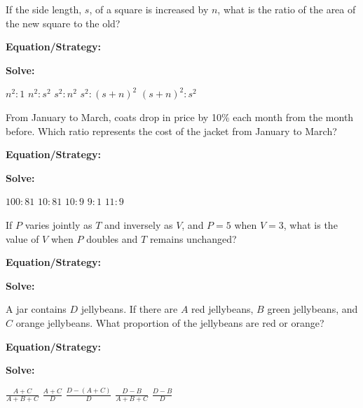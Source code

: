 \vfill
\newpage
\begin{multicols*}{2}
\begin{outline}[enumerate]
\medium

\1 If the side length, $s$, of a square is increased by $n$, what is the ratio of the area of the new square to the old?

\bigskip
\textbf{Equation/Strategy:} \hrulefill

\bigskip
\textbf{Solve:}

\vfill
\2 $n^2:1$
\2 $n^2:s^2$
\2 $s^2:n^2$
\2 $s^2:(s+n)^2$
\2 $(s+n)^2:s^2$

\midline

\1 From January to March, coats drop in price by 10\% each month from the month before. Which ratio represents the cost of the jacket from January to March?

\bigskip
\textbf{Equation/Strategy:} \hrulefill

\bigskip
\textbf{Solve:}

\vfill
\2 $100:81$
\2 $10:81$
\2 $10:9$
\2 $9:1$
\2 $11:9$

\columnbreak
\advanced

\1 If $P$ varies jointly as $T$ and inversely as $V$, and $P=5$ when $V=3$, what is the value of $V$ when $P$ doubles and $T$ remains unchanged?

\bigskip
\textbf{Equation/Strategy:} \hrulefill

\bigskip
\textbf{Solve:}

\vfill
{}

\midline

\1 A jar contains $D$ jellybeans. If there are $A$ red jellybeans, $B$ green jellybeans, and $C$ orange jellybeans. What proportion of the jellybeans are red or orange?

\bigskip
\textbf{Equation/Strategy:} \hrulefill

\bigskip
\textbf{Solve:}

\vfill
\2 $\frac{A+C}{A+B+C}$
\2 $\frac{A+C}{D}$
\2 $\frac{D-(A+C)}{D}$
\2 $\frac{D-B}{A+B+C}$
\2 $\frac{D-B}{D}$
\end{outline}
\end{multicols*}